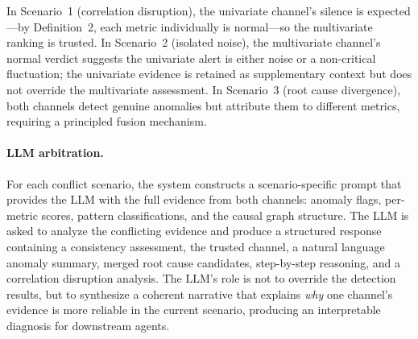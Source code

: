 \documentclass[a4paper,fleqn]{cas-dc}
\begin{document}
In Scenario~1 (correlation disruption), the univariate channel's silence is expected---by Definition~2, each metric individually is normal---so the multivariate ranking is trusted.  In Scenario~2 (isolated noise), the multivariate channel's normal verdict suggests the univariate alert is either noise or a non-critical fluctuation; the univariate evidence is retained as supplementary context but does not override the multivariate assessment.  In Scenario~3 (root cause divergence), both channels detect genuine anomalies but attribute them to different metrics, requiring a principled fusion mechanism.

\paragraph{LLM arbitration.}
For each conflict scenario, the system constructs a scenario-specific prompt that provides the LLM with the full evidence from both channels: anomaly flags, per-metric scores, pattern classifications, and the causal graph structure.  The LLM is asked to analyze the conflicting evidence and produce a structured response containing a consistency assessment, the trusted channel, a natural language anomaly summary, merged root cause candidates, step-by-step reasoning, and a correlation disruption analysis.  The LLM's role is not to override the detection results, but to synthesize a coherent narrative that explains \emph{why} one channel's evidence is more reliable in the current scenario, producing an interpretable diagnosis for downstream agents.
\end{document}
